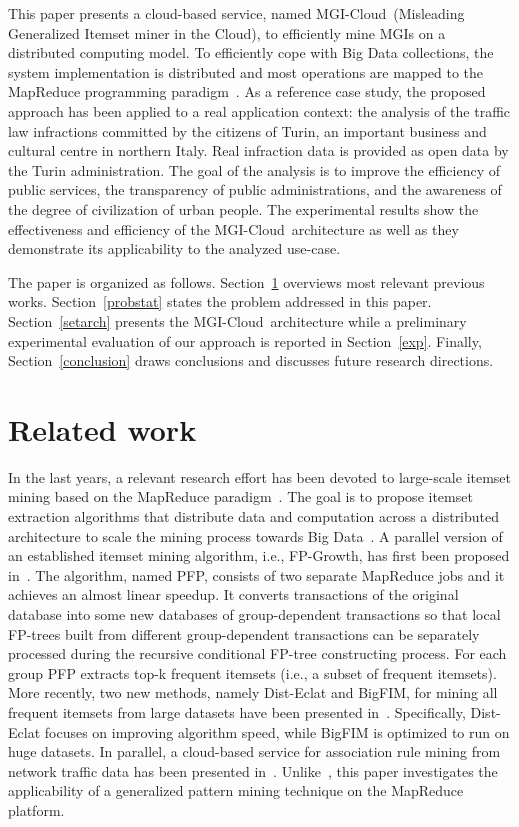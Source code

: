 \documentclass[10pt, conference, compsocconf]{IEEEtran}
\newcommand{\SeTAB}{{\sc MGI-Cloud}}
\newcommand{\SeTA}{{\sc M}isleading {\sc G}eneralized {\sc I}temset miner in the {\sc Cloud}}
\begin{document}
This paper presents a cloud-based service, named \SeTAB\ (\SeTA ), to efficiently mine MGIs on a distributed computing model. 
To efficiently cope with Big Data collections, the system implementation is distributed and most operations are mapped to the MapReduce programming paradigm~\cite{Dean2008}. 
As a reference case study, the proposed approach has been applied to a real application context: the analysis of the traffic law infractions committed by 
the citizens of Turin, an important business and cultural centre in northern Italy. 
Real infraction data is provided as open data by the Turin administration.
The goal of the analysis is to improve the efficiency of public services, 
the transparency of public administrations, and the awareness of the degree of civilization of urban people.
The experimental results show the effectiveness and efficiency of the \SeTAB\ architecture as well as they demonstrate its applicability to the analyzed use-case. 

The paper is organized as follows. Section~\ref{relwork} overviews most relevant previous works. 
Section~\ref{probstat} states the problem addressed in this
paper. Section~\ref{setarch} presents the \SeTAB\ architecture while a preliminary experimental evaluation of our approach is reported in Section~\ref{exp}. Finally,
Section~\ref{conclusion} draws conclusions and discusses future research directions.

\section{Related work}
\label{relwork}

In the last years, a relevant research effort has been devoted to large-scale itemset mining based on the MapReduce paradigm~\cite{Dean2008}. 
The goal is to propose itemset extraction algorithms that distribute data and computation across a distributed architecture to scale the mining process towards Big Data~\cite{pfpgrowth,bigfim,ISPA13}.
A parallel version of an established itemset mining algorithm, i.e., FP-Growth, has first been proposed in~\cite{pfpgrowth}. 
The algorithm, named PFP, consists of two separate MapReduce jobs 
and it achieves an almost linear speedup.
It converts transactions of the original database into some new databases of group-dependent transactions so that local FP-trees built
from different group-dependent transactions can be separately processed during the recursive conditional FP-tree constructing process. 
For each group PFP extracts top-k frequent itemsets (i.e., a subset of frequent itemsets).
More recently, two new methods, namely Dist-Eclat and BigFIM, for mining all frequent itemsets from large datasets 
have been presented in~\cite{bigfim}. 
Specifically, Dist-Eclat focuses on improving algorithm speed, while BigFIM is optimized to run on huge datasets.
In parallel, a cloud-based service for association rule mining from network traffic data has been presented in~\cite{ISPA13}.
Unlike~\cite{pfpgrowth,bigfim,ISPA13}, this paper investigates the applicability of a generalized pattern mining technique on the MapReduce platform. 
\end{document}
